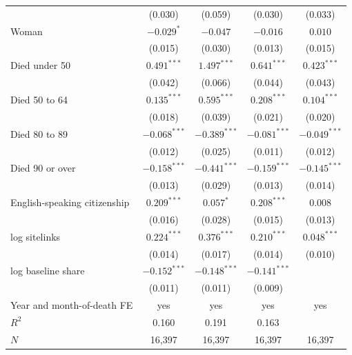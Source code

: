 \documentclass[11pt,a4paper]{article}
\begin{document}
\begin{table}[tbp]
\begin{tabular}{lcccc}
 & (0.030) & (0.059) & (0.030) & (0.033)\\
Woman & $-0.029^{*}$ & $-0.047$ & $-0.016$ & $0.010$\\
 & (0.015) & (0.030) & (0.013) & (0.015)\\
Died under 50 & $0.491^{***}$ & $1.497^{***}$ & $0.641^{***}$ & $0.423^{***}$\\
 & (0.042) & (0.066) & (0.044) & (0.043)\\
Died 50 to 64 & $0.135^{***}$ & $0.595^{***}$ & $0.208^{***}$ & $0.104^{***}$\\
 & (0.018) & (0.039) & (0.021) & (0.020)\\
Died 80 to 89 & $-0.068^{***}$ & $-0.389^{***}$ & $-0.081^{***}$ & $-0.049^{***}$\\
 & (0.012) & (0.025) & (0.011) & (0.012)\\
Died 90 or over & $-0.158^{***}$ & $-0.441^{***}$ & $-0.159^{***}$ & $-0.145^{***}$\\
 & (0.013) & (0.029) & (0.013) & (0.014)\\
English-speaking citizenship & $0.209^{***}$ & $0.057^{*}$ & $0.208^{***}$ & $0.008$\\
 & (0.016) & (0.028) & (0.015) & (0.013)\\
log sitelinks & $0.224^{***}$ & $0.376^{***}$ & $0.210^{***}$ & $0.048^{***}$\\
 & (0.014) & (0.017) & (0.014) & (0.010)\\
log baseline share & $-0.152^{***}$ & $-0.148^{***}$ & $-0.141^{***}$ & \\
 & (0.011) & (0.011) & (0.009) & \\
\midrule Year and month-of-death FE & yes & yes & yes & yes\\
$R^2$ & 0.160 & 0.191 & 0.163 & \\
$N$ & 16,397 & 16,397 & 16,397 & 16,397\\
\bottomrule\end{tabular}\end{table}
\end{document}
